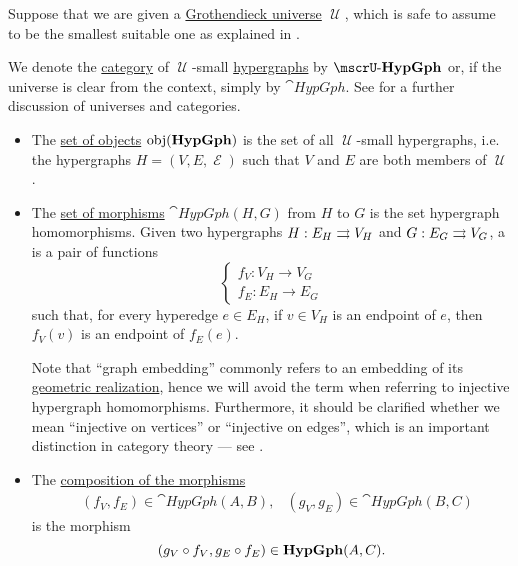 \begin{definition}\label{def:category_of_small_hypergraphs}
  Suppose that we are given a \hyperref[def:grothendieck_universe]{Grothendieck universe} \( \mscrU \), which is safe to assume to be the smallest suitable one as explained in .

  We denote the \hyperref[def:category]{category} of \( \mscrU \)-small \hyperref[def:hypergraph]{hypergraphs} by \( \ucat{HypGph} \) or, if the universe is clear from the context, simply by \( \cat{HypGph} \). See  for a further discussion of universes and categories.

  \begin{itemize}
    \item The \hyperref[def:category/objects]{set of objects} \( \operatorname{obj}(\operatorname{\mathbf{HypGph}}) \) is the set of all \( \mscrU \)-small hypergraphs, i.e. the hypergraphs \( H = (V, E, \mscrE) \) such that \( V \) and \( E \) are both members of \( \mscrU \).

    \item The \hyperref[def:category/morphisms]{set of morphisms} \( \cat{HypGph}(H, G) \) from \( H \) to \( G \) is the set hypergraph homomorphisms. Given two hypergraphs \( H: E_H \rightrightarrows V_H \) and \( G: E_G \rightrightarrows V_G \), a  is a pair of functions
    \begin{equation}\label{eq:def:category_of_small_hypergraphs/homomorphism}
      \begin{cases}
        f_V: V_H \to V_G \\
        f_E: E_H \to E_G
      \end{cases}
    \end{equation}
    such that, for every hyperedge \( e \in E_H \), if \( v \in V_H \) is an endpoint of \( e \), then \( f_V(v) \) is an endpoint of \( f_E(e) \).

    Note that \enquote{graph embedding} commonly refers to an embedding of its \hyperref[def:quiver_geometric_realization/undirected]{geometric realization}, hence we will avoid the term when referring to injective hypergraph homomorphisms. Furthermore, it should be clarified whether we mean \enquote{injective on vertices} or \enquote{injective on edges}, which is an important distinction in category theory --- see .

    \item The \hyperref[def:category/composition]{composition of the morphisms}
    \begin{align*}
      &(f_V, f_E) \in \cat{HypGph}(A, B),
      &(g_V, g_E) \in \cat{HypGph}(B, C)
    \end{align*}
    is the morphism
    \begin{equation*}
      (g_V \bincirc f_V, g_E \bincirc f_E) \in \cat{HypGph}(A, C).
    \end{equation*}


\end{itemize}
\end{definition}
